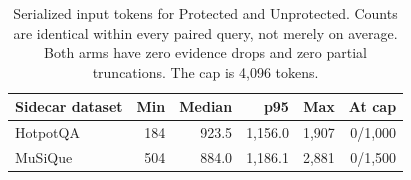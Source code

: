 \begin{table}[t]
\centering\small
\begin{tabular}{@{}lrrrrr@{}}
\toprule
Sidecar dataset & Min & Median & p95 & Max & At cap\\
\midrule
HotpotQA & 184 & 923.5 & 1,156.0 & 1,907 & 0/1,000\\
MuSiQue & 504 & 884.0 & 1,186.1 & 2,881 & 0/1,500\\
\bottomrule
\end{tabular}
\caption{Serialized input tokens for Protected and Unprotected. Counts are
identical within every paired query, not merely on average. Both arms have
zero evidence drops and zero partial truncations. The cap is 4,096 tokens.}
\label{tab:tokens}
\end{table}
